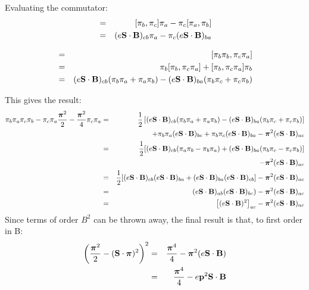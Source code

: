 Evaluating the commutator:
\begin{eqnarray*}
[\pi_b, \pi_c \pi_a]
	&=&	[\pi_b, \pi_c]\pi_a - \pi_c [\pi_a, \pi_b]	\\
	&=&	(e \v{S} \cdot \v{B})_{cb} \pi_a
				- \pi_c (e \v{S} \cdot \v{B})_{ba}	
\end{eqnarray*}

\begin{eqnarray*}
[ \gv{\pi}^2, \pi_c \pi_a]
	&=&	[\pi_b \pi_b, \pi_c \pi_a]	\\
	&=&	\pi_b [\pi_b, \pi_c \pi_a] + [\pi_b, \pi_c \pi_a] \pi_b	\\
	&=&	(e \v{S} \cdot \v{B})_{cb} ( \pi_b \pi_a + \pi_a \pi_b)
				-  (e \v{S} \cdot \v{B})_{ba} (\pi_b \pi_c + \pi_c \pi_b)	
\end{eqnarray*}


This gives the result:
\small
\begin{eqnarray*}
\pi_b \pi_a \pi_c \pi_b  
	- \pi_c \pi_a \frac{\mbox{\boldmath$ \pi $}^2}{2} 
	- \frac{\mbox{\boldmath$ \pi $}^2}{4} \pi_c \pi_a
	&=&	\frac{1}{2} \left [ (e \mathbf{S} \cdot \mathbf{B})_{cb} ( \pi_b \pi_a + \pi_a \pi_b)
				-  (e \mathbf{S} \cdot \mathbf{B})_{ba} (\pi_b \pi_c + \pi_c \pi_b)  \right  ] \\
	&&		+ \pi_b \pi_a (e \mathbf{S} \cdot \mathbf{B})_{bc} 
				+ \pi_b \pi_c (e \mathbf{S} \cdot \mathbf{B})_{ba}
				-\mbox{\boldmath$ \pi $}^2 (e \mathbf{S} \cdot \mathbf{B})_{ac}	\\
	&=&	\frac{1}{2} [(e \mathbf{S} \cdot \mathbf{B})_{cb} ( \pi_a \pi_b - \pi_b \pi_a)
				+ (e \mathbf{S} \cdot \mathbf{B})_{ba} (\pi_b \pi_c - \pi_c \pi_b)]
	\\&&			-\mbox{\boldmath$ \pi $}^2 (e \mathbf{S} \cdot \mathbf{B})_{ac}	\\
	&=&	\frac{1}{2} [(e \mathbf{S} \cdot \mathbf{B})_{cb} (e \mathbf{S} \cdot \mathbf{B})_{ba}
				+ (e \mathbf{S} \cdot \mathbf{B})_{ba} (e \mathbf{S} \cdot \mathbf{B})_{cb}]
				-\mbox{\boldmath$ \pi $}^2 (e \mathbf{S} \cdot \mathbf{B})_{ac}	\\
	&=&	(e \mathbf{S} \cdot \mathbf{B})_{ab}(e \mathbf{S} \cdot \mathbf{B})_{bc})
				-\mbox{\boldmath$ \pi $}^2 (e \mathbf{S} \cdot \mathbf{B})_{ac}	\\
	&=&	\left[ (e \mathbf{S} \cdot \mathbf{B})^2 \right ]_{ac}
				-\mbox{\boldmath$ \pi $}^2 (e \mathbf{S} \cdot \mathbf{B})_{ac}	\\
\end{eqnarray*}
\normalsize
Since terms of order $B^2$ can be thrown away, the final result is that, to first order in B:
\begin{eqnarray*}
 \left(  \frac {\mbox{\boldmath$ \pi $}^2} {2} -  (\mathbf{S} \cdot \mbox{\boldmath$ \pi $})^2   \right )^2
	&=&	\frac{ \mbox{\boldmath$ \pi $}^4 } {4}  -  \mbox{\boldmath$ \pi $}^2 (e \mathbf{S} \cdot \mathbf{B}) \\
	&=& 	\frac{ \mbox{\boldmath$ \pi $}^4 } {4}  -  e \mathbf{p}^2  \mathbf{S} \cdot \mathbf{B} \\
\end{eqnarray*}

